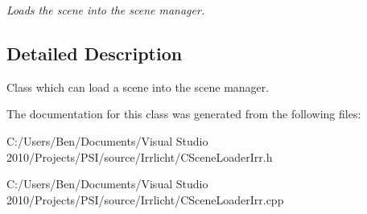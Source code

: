 \begin{DoxyCompactItemize}
\begin{DoxyCompactList}\small\item\em Loads the scene into the scene manager. \end{DoxyCompactList}\end{DoxyCompactItemize}


\subsection{Detailed Description}
Class which can load a scene into the scene manager. 

The documentation for this class was generated from the following files\-:\begin{DoxyCompactItemize}
\item 
C\-:/\-Users/\-Ben/\-Documents/\-Visual Studio 2010/\-Projects/\-P\-S\-I/source/\-Irrlicht/C\-Scene\-Loader\-Irr.\-h\item 
C\-:/\-Users/\-Ben/\-Documents/\-Visual Studio 2010/\-Projects/\-P\-S\-I/source/\-Irrlicht/C\-Scene\-Loader\-Irr.\-cpp\end{DoxyCompactItemize}
